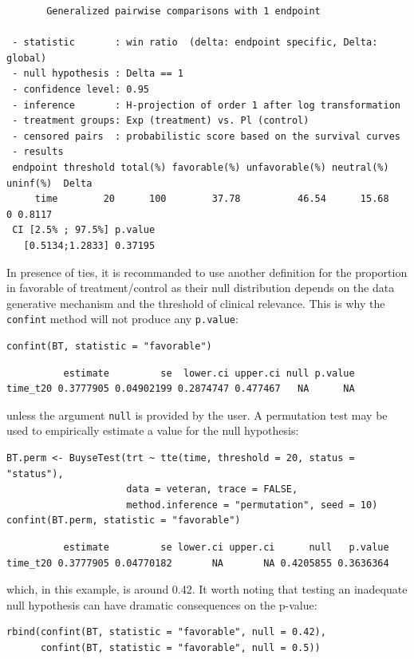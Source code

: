 \documentclass[12pt]{article}
\newcommand\Warning[1][3ex]{%
\renewcommand\stacktype{L}%
\scaleto{\stackon[1.3pt]{\color{red}$\triangle$}{\tiny\bfseries !}}{#1}%
\xspace
}
\begin{document}
\begin{verbatim}
       Generalized pairwise comparisons with 1 endpoint

 - statistic       : win ratio  (delta: endpoint specific, Delta: global) 
 - null hypothesis : Delta == 1 
 - confidence level: 0.95 
 - inference       : H-projection of order 1 after log transformation 
 - treatment groups: Exp (treatment) vs. Pl (control) 
 - censored pairs  : probabilistic score based on the survival curves
 - results
 endpoint threshold total(%) favorable(%) unfavorable(%) neutral(%) uninf(%)  Delta
     time        20      100        37.78          46.54      15.68        0 0.8117
 CI [2.5% ; 97.5%] p.value 
   [0.5134;1.2833] 0.37195
\end{verbatim}

\Warning In presence of ties, it is recommanded to use another
definition for the proportion in favorable of treatment/control as
their null distribution depends on the data generative mechanism and
the threshold of clinical relevance. This is why the \texttt{confint} method
will not produce any \texttt{p.value}:
\lstset{language=r,label= ,caption= ,captionpos=b,numbers=none}
\begin{lstlisting}
confint(BT, statistic = "favorable")
\end{lstlisting}

\begin{verbatim}
          estimate         se  lower.ci upper.ci null p.value
time_t20 0.3777905 0.04902199 0.2874747 0.477467   NA      NA
\end{verbatim}


unless the argument \texttt{null} is provided by the user. A permutation test
may be used to empirically estimate a value for the null hypothesis:
\lstset{language=r,label= ,caption= ,captionpos=b,numbers=none}
\begin{lstlisting}
BT.perm <- BuyseTest(trt ~ tte(time, threshold = 20, status = "status"),
                     data = veteran, trace = FALSE,
                     method.inference = "permutation", seed = 10)
confint(BT.perm, statistic = "favorable")
\end{lstlisting}

\begin{verbatim}
          estimate         se lower.ci upper.ci      null   p.value
time_t20 0.3777905 0.04770182       NA       NA 0.4205855 0.3636364
\end{verbatim}


which, in this example, is around 0.42. It worth noting that testing
an inadequate null hypothesis can have dramatic consequences on the
p-value:
\lstset{language=r,label= ,caption= ,captionpos=b,numbers=none}
\begin{lstlisting}
rbind(confint(BT, statistic = "favorable", null = 0.42),
      confint(BT, statistic = "favorable", null = 0.5))
\end{lstlisting}
\end{document}
